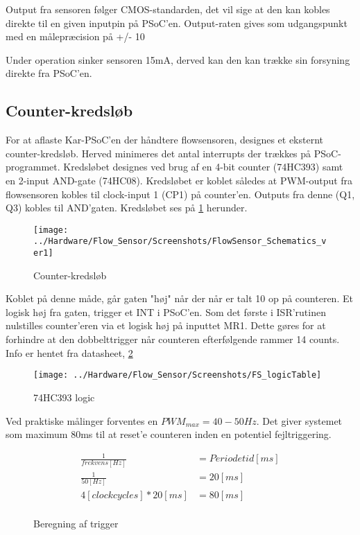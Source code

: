 Output fra sensoren følger CMOS-standarden, det vil sige at den kan kobles direkte til en given inputpin på PSoC'en. Output-raten gives som udgangspunkt med en målepræcision på +/- 10%
 
Under operation sinker sensoren 15mA, derved kan den kan trække sin forsyning direkte fra PSoC'en.

\subsection{Counter-kredsløb}
For at aflaste Kar-PSoC'en der håndtere flowsensoren, designes et eksternt counter-kredsløb. Herved minimeres det antal interrupts der trækkes på PSoC-programmet. Kredsløbet designes ved brug af en 4-bit counter (74HC393) samt en 2-input AND-gate (74HC08). 
Kredsløbet er koblet således at PWM-output fra flowsensoren kobles til clock-input 1 (CP1) på counter'en. Outputs fra denne (Q1, Q3) kobles til AND'gaten.
Kredsløbet ses på \ref{screenshot:counter} herunder. 

\begin{figure}[H]
	\centering
	\texttt{[image: ../Hardware/Flow\_Sensor/Screenshots/FlowSensor\_Schematics\_ver1]}
	\caption{Counter-kredsløb}
	\label{screenshot:counter}
\end{figure}

Koblet på denne måde, går gaten "høj" når der når er talt 10 op på counteren. Et logisk høj fra gaten, trigger et INT i PSoC'en. Som det første i ISR'rutinen nulstilles counter'eren via et logisk høj på inputtet MR1. Dette gøres for at forhindre at den dobbelttrigger når counteren efterfølgende rammer 14 counts. Info er hentet fra datasheet, \ref{screenshot:logicTable}

\begin{figure}[H]
	\centering
	\texttt{[image: ../Hardware/Flow\_Sensor/Screenshots/FS\_logicTable]}
	\caption{74HC393 logic}
	\label{screenshot:logicTable}
\end{figure}

Ved praktiske målinger forventes en $PWM_{max}=40-50Hz$.
Det giver systemet som maximum 80ms til at reset'e counteren inden en potentiel fejltriggering.

\begin{figure}[H]
    \begin{align*}
       \frac{1}{frekvens[Hz]} &= Periodetid[ms] \\
       \frac{1}{50[Hz]} &= 20[ms] \\
       4[clockcycles]*20[ms] &= 80[ms] \\ 
    \end{align*}
\label{eq:Trigger}
\caption{Beregning af trigger}
\end{figure}

